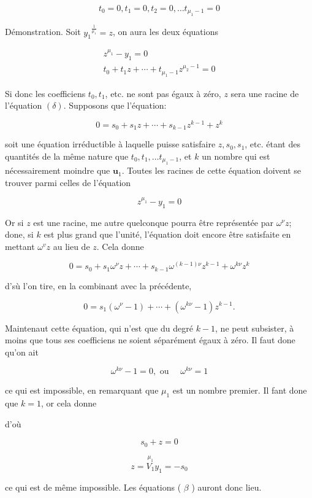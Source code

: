 \documentclass{article}
\begin{document}
\[
t_{0}=0, t_{1}=0, t_{2}=0, \ldots t_{\mu_{1}-1}=0
\]

Démonstration. Soit \(y_{1}{ }^{\frac{1}{\mu_{1}}}=z\), on aura les deux équations

\[
\begin{gathered}
z^{\mu_{1}}-y_{1}=0 \\
t_{0}+t_{1} z+\cdots+t_{\mu_{1}-1} z^{\mu_{2}-1}=0
\end{gathered}
\]

Si donc les coefficiens \(t_{0}, t_{1}\), etc. ne sont pas égaux à zéro, \(z\) sera une racine de l'équation \((\mathcal{\delta})\). Supposons que l'équation:

\[
0=s_{0}+s_{1} z+\cdots+s_{k-1} z^{k-1}+z^{k}
\]

soit une équation irréductible à laquelle puisse satisfaire \(z, s_{0}, s_{1}\), etc. étant des quantités de la même nature que \(t_{0}, t_{1}, \ldots t_{\mu_{1}-1}\), et \(k\) un nombre qui est nécessairement moindre que \(\boldsymbol{u}_{1}\). Toutes les racines de cette équation doivent se trouver parmi celles de l'équation

\[
z^{\mu_{1}}-y_{1}=0
\]

Or si \(z\) est une racine, me autre quelconque pourra être représentée par \(\omega^{\nu} z\); done, si \(k\) est plus grand que l'unité, l'équation doit encore être satisfaite en mettant \(\omega^{v} z\) au lieu de \(z\). Cela donne

\[
0=s_{0}+s_{1} \omega^{\nu} z+\cdots+s_{k-1} \omega^{(k-1) \nu} z^{k-1}+\omega^{k \nu} z^{k}
\]

d'sù l'on tire, en la combinant avec la précédente,

\[
0=s_{1}\left(\omega^{\nu}-1\right)+\cdots+\left(\omega^{k \nu}-1\right) z^{k-1} .
\]

Maintenaut cette équation, qui n'est que du degré \(k-1\), ne peut subsister, à moins que tous ses coefficiens ne soient séparément égaux à zéro. Il faut done qu'on ait

\[
\omega^{k \nu}-1=0, \text { ou } \quad \omega^{k \nu}=1
\]

ce qui est impossible, en remarquant que \(\mu_{1}\) est un nombre premier. Il fant done que \(k=1\), or cela donne

d'où

\[
s_{0}+z=0
\]

\[
z=\stackrel{\mu_{1}}{V_{1}} y_{1}=-s_{0}
\]

ce qui est de même impossible. Les équations ( \(\beta\) ) auront donc lieu.
\end{document}
